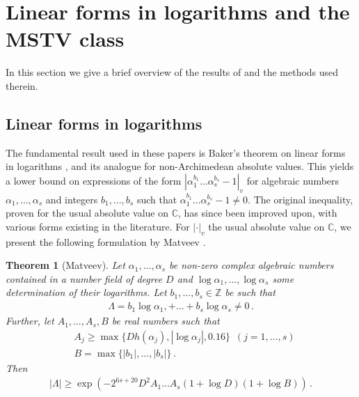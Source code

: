 \documentclass{article}\usepackage[a4paper,margin=20mm]{geometry}
\newtheorem{theorem}{Theorem}\newtheorem{lemma}[theorem]{Lemma}\newtheorem{proposition}[theorem]{Proposition}\newtheorem{corollary}[theorem]{Corollary}\newtheorem{definition}[theorem]{Definition}\newtheorem{claim}[theorem]{Claim}\newtheorem{remark}[theorem]{Remark}\newtheorem{observation}[theorem]{Observation}\newtheorem{conjecture}[theorem]{Conjecture}\newtheorem{example}[theorem]{Example}
\newcommand{\Z}{\mathbb{Z}}
\begin{document}
\section{Linear forms in logarithms and the MSTV class} 
In this section we give a brief overview of the results of \cite{Mignotte_distance,Vereshchagin} and the methods used therein. 
\subsection{Linear forms in logarithms}
The fundamental result used in these papers is Baker's theorem on linear forms in logarithms \cite{Baker_Sharpening_II_1973}, and its analogue for non-Archimedean absolute values. This yields a lower bound on expressions of the form $|\alpha_1^{b_1} \dots \alpha_s^{b_s}-1|_v$ for algebraic numbers $\alpha_1, \dots , \alpha_s$ and integers $b_1, \dots , b_s$ such that $\alpha_1^{b_1} \dots  \alpha_s^{b_s} - 1 \neq 0$. The original inequality, proven for the usual absolute value on $\mathbb C$, has since been improved upon, with various forms existing in the literature. For $|\cdot|_v$ the usual absolute value on $\mathbb C$, we present the following formulation by Matveev \cite[Corollary 2.3]{matveev_explicit_2000}.
\begin{theorem}[Matveev]\label{Matveev} Let $\alpha_1, \dots , \alpha_s$ be non-zero complex algebraic numbers contained in a number field of degree $D$ and $\log \alpha_1, \dots , \log \alpha_s$ some determination of their logarithms. Let $b_1, \dots , b_s \in \Z$ be such that 
\begin{align*}
    \Lambda = b_1 \log \alpha_1, + \dots + b_s \log \alpha_s \neq 0 \, .
\end{align*}
Further, let $A_1, \dots , A_s, B$ be real numbers such that 
\begin{align*}
    &A_j \geq \max\{Dh(\alpha_j), |\log \alpha_j|, 0.16\} \, \, \, (j = 1, \dots , s) \\
    &B = \max\{|b_1|, \dots , |b_s|\} \, .
\end{align*}
Then 
\begin{align*}
    |\Lambda| \geq \exp\left(-2^{6s+20}D^2 A_1 \dots A_s (1+ \log D)(1+ \log B)\right) \, .
\end{align*}
\end{theorem}
\end{document}
